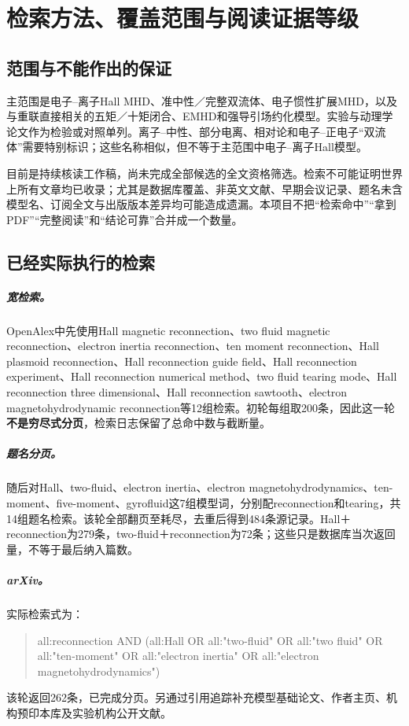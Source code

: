 \chapter{检索方法、覆盖范围与阅读证据等级}
\section{范围与不能作出的保证}
主范围是电子--离子Hall MHD、准中性／完整双流体、电子惯性扩展MHD，以及与重联直接相关的五矩／十矩闭合、EMHD和强导引场约化模型。实验与动理学论文作为检验或对照单列。离子--中性、部分电离、相对论和电子--正电子“双流体”需要特别标识；这些名称相似，但不等于主范围中电子--离子Hall模型。

目前是持续核读工作稿，尚未完成全部候选的全文资格筛选。检索不可能证明世界上所有文章均已收录；尤其是数据库覆盖、非英文文献、早期会议记录、题名未含模型名、订阅全文与出版版本差异均可能造成遗漏。本项目不把“检索命中”“拿到PDF”“完整阅读”和“结论可靠”合并成一个数量。

\section{已经实际执行的检索}
\paragraph{宽检索。}OpenAlex中先使用Hall magnetic reconnection、two fluid magnetic reconnection、electron inertia reconnection、ten moment reconnection、Hall plasmoid reconnection、Hall reconnection guide field、Hall reconnection experiment、Hall reconnection numerical method、two fluid tearing mode、Hall reconnection three dimensional、Hall reconnection sawtooth、electron magnetohydrodynamic reconnection等12组检索。初轮每组取200条，因此这一轮\textbf{不是穷尽式分页}，检索日志保留了总命中数与截断量。

\paragraph{题名分页。}随后对Hall、two-fluid、electron inertia、electron magnetohydrodynamics、ten-moment、five-moment、gyrofluid这7组模型词，分别配reconnection和tearing，共14组题名检索。该轮全部翻页至耗尽，去重后得到484条源记录。Hall＋reconnection为279条，two-fluid＋reconnection为72条；这些只是数据库当次返回量，不等于最后纳入篇数。

\paragraph{arXiv。}实际检索式为：
\begin{quote}\small
all:reconnection AND (all:Hall OR all:"two-fluid" OR all:"two fluid" OR all:"ten-moment" OR all:"electron inertia" OR all:"electron magnetohydrodynamics")
\end{quote}
该轮返回262条，已完成分页。另通过引用追踪补充模型基础论文、作者主页、机构预印本库及实验机构公开文献。


